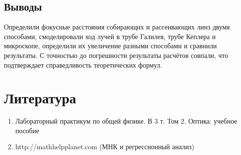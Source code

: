 \documentclass[a4paper, 12pt]{article}%
\begin{document}
\subsection{Выводы}

Определили фокусные расстояния собирающих и рассеивающих линз двумя способами, смоделировали ход лучей в трубе Галилея, трубе Кеплера и микроскопе, определили их увеличение разными способами и сравнили результаты. С точностью до погрешности результаты расчётов совпали, что подтверждает справедливость теоретических формул.

\section{Литература}

\begin{enumerate}

\item Лабораторный практикум по общей физике. В 3 т. Том 2. Оптика: учебное пособие

\item http://mathhelpplanet.com (МНК и регрессионный анализ)


\end{enumerate}	
\end{document}
